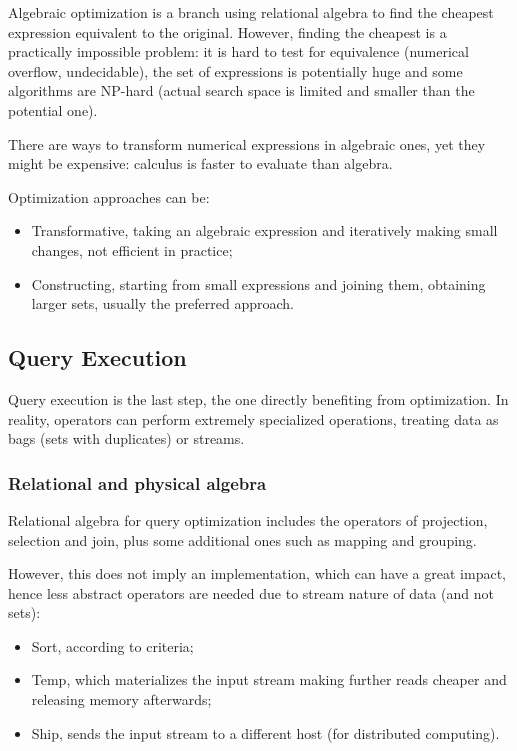 Algebraic optimization is a branch using relational algebra to find the cheapest expression equivalent to the original. However, finding the cheapest is a practically impossible problem: it is hard to test for equivalence (numerical overflow, undecidable), the set of expressions is potentially huge and some algorithms are NP-hard (actual search space is limited and smaller than the potential one). 

There are ways to transform numerical expressions in algebraic ones, yet they might be expensive: calculus is faster to evaluate than algebra. 

Optimization approaches can be:
\begin{itemize}
	\item Transformative, taking an algebraic expression and iteratively making small changes, not efficient in practice;
	\item Constructing, starting from small expressions and joining them, obtaining larger sets, usually the preferred approach.
\end{itemize}

\subsection{Query Execution}
Query execution is the last step, the one directly benefiting from optimization. In reality, operators can perform extremely specialized operations, treating data as bags (sets with duplicates) or streams.

\subsubsection{Relational and physical algebra}
Relational algebra for query optimization includes the operators of projection, selection and join, plus some additional ones such as mapping and grouping.

However, this does not imply an implementation, which can have a great impact, hence less abstract operators are needed due to stream nature of data (and not sets):
\begin{itemize}
	\item Sort, according to criteria;
	\item Temp, which materializes the input stream making further reads cheaper and releasing memory afterwards;
	\item Ship, sends the input stream to a different host (for distributed computing).
\end{itemize}


